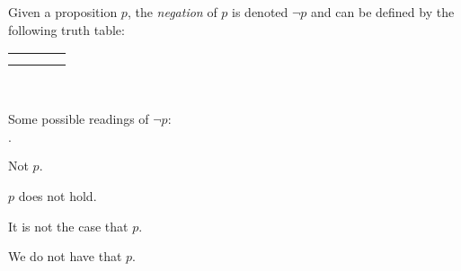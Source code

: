 \begin{definition}[Negation]
    \begin{minipage}[t]{.55\linewidth}
        Given a proposition $p$, the \emph{negation} of $p$
        is denoted $\neg p$ and can be defined by the following truth table:
        \begin{table}[H]
            \centering
            \label{tab:not}
            \begin{tabular}{|Cc||Cc|} \hline
                 &  \\ \hline
                \thead{$\top$} &  \\
                \thead{$\bot$} &  \\ \hline
            \end{tabular}
        \end{table}
    \end{minipage}%
    \begin{minipage}[t]{.05\linewidth}
        ~
    \end{minipage}%
    \begin{minipage}[t]{.4\linewidth}
        Some possible readings of $\neg p$:\\
        \begin{list}{$\cdot$}{}
            \item
                Not $p$.
            \item
                $p$ does not hold.
            \item
                It is not the case that $p$.
            \item
                We do not have that $p$.
        \end{list}
    \end{minipage}
\end{definition}

